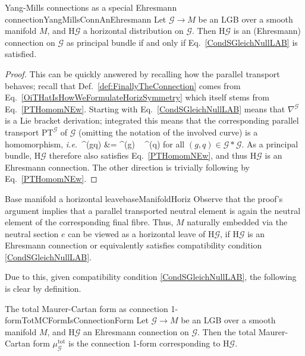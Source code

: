 \documentclass[a4paper,oneside,11pt,bibliography=totoc]{scrartcl}
\def\bas#1\eas{\begin{align*}#1\end{align*}}
\theoremstyle{plain}
\theoremstyle{remark}
\theoremstyle{definition}
\begin{document}
\begin{lemmata}{Yang-Mills connections as a special Ehresmann connection}{YangMillsConnAnEhresmann}
Let $\mathcal{G} \to M$ be an LGB over a smooth manifold $M$, and $\mathrm{H}\mathcal{G}$ a horizontal distribution on $\mathcal{G}$. Then $\mathrm{H}\mathcal{G}$ is an (Ehresmann) connection on $\mathcal{G}$ as principal bundle if and only if Eq.\ \eqref{CondSGleichNullLAB} is satisfied.
\end{lemmata}

\begin{proof}
\leavevmode\newline
This can be quickly answered by recalling how the parallel transport behaves; recall that Def.\ \ref{def:FinallyTheConnection} comes from Eq.\ \eqref{OiTHatIsHowWeFormulateHorizSymmetry} which itself stems from Eq.\ \eqref{PTHomomNEw}. Starting with Eq.\ \eqref{CondSGleichNullLAB} means that $\nabla^{\mathcal{G}}$ is a Lie bracket derivation; integrated this means that the corresponding parallel transport $\mathrm{PT}^{\mathcal{G}}$ of $\mathcal{G}$ (omitting the notation of the involved curve) is a homomorphism, \textit{i.e.}\
\bas
\mathrm{PT}^{}(gq)
&=
^{}(g) ~ ^{}(q)
\eas
for all $(g, q) \in \mathcal{G} * \mathcal{G}$. As a principal bundle, $\mathrm{H}\mathcal{G}$ therefore also satisfies Eq.\ \eqref{PTHomomNEw}, and thus $\mathrm{H}\mathcal{G}$ is an Ehresmann connection. The other direction is trivially following by Eq.\ \eqref{PTHomomNEw}.
\end{proof}

\begin{remarks}{Base manifold a horizontal leave}{baseManifoldHoriz}
Observe that the proof's argument implies that a parallel transported neutral element is again the neutral element of the corresponding final fibre. Thus, $M$ naturally embedded via the neutral section $e$ can be viewed as a horizontal leave of $\mathrm{H}\mathcal{G}$, if $\mathrm{H}\mathcal{G}$ is an Ehresmann connection or equivalently satisfies compatibility condition \eqref{CondSGleichNullLAB}.
\end{remarks}

Due to this, given compatibility condition \eqref{CondSGleichNullLAB}, the following is clear by definition.

\begin{corollaries}{The total Maurer-Cartan form as connection 1-form}{TotMCFormIsConnectionForm}
Let $\mathcal{G} \to M$ be an LGB over a smooth manifold $M$, and $\mathrm{H}\mathcal{G}$ an Ehresmann connection on $\mathcal{G}$. Then the total Maurer-Cartan form $\mu_{\mathcal{G}}^{\mathrm{tot}}$ is the connection 1-form corresponding to $\mathrm{H}\mathcal{G}$.
\end{corollaries}
\end{document}
